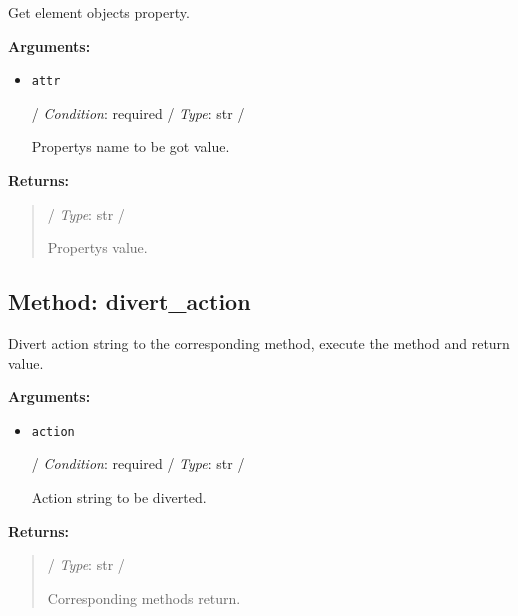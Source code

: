 Get element object\textquotesingle s property.

\textbf{Arguments:}

\begin{itemize}
\item
  \texttt{attr}

  / \emph{Condition}: required / \emph{Type}: str /

  Property\textquotesingle s name to be got value.
\end{itemize}

\textbf{Returns:}

\begin{quote}
/ \emph{Type}: str /

Property\textquotesingle s value.
\end{quote}

\hypertarget{qconnectwinapp-actionhandlers-element-handler-elementactionhandler-divert-action}{%
\subsection{Method: divert\_action}\label{qconnectwinapp-actionhandlers-element-handler-elementactionhandler-divert-action}}

Divert action string to the corresponding method, execute the method and
return value.

\textbf{Arguments:}

\begin{itemize}
\item
  \texttt{action}

  / \emph{Condition}: required / \emph{Type}: str /

  Action string to be diverted.
\end{itemize}

\textbf{Returns:}

\begin{quote}
/ \emph{Type}: str /

Corresponding method\textquotesingle s return.
\end{quote}
